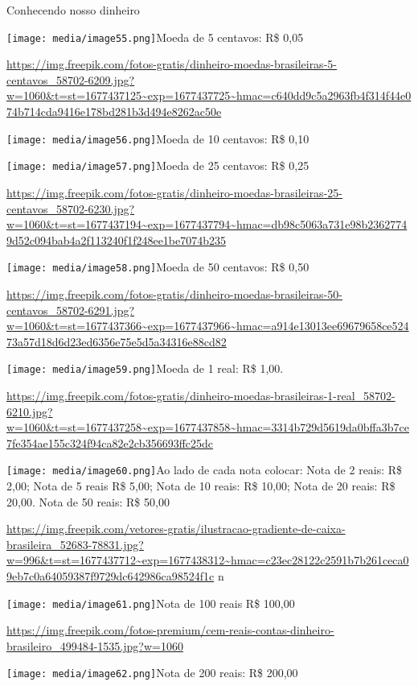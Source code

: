 Conhecendo nosso dinheiro

\texttt{[image: media/image55.png]}Moeda
de 5 centavos: R\$ 0,05

\url{https://img.freepik.com/fotos-gratis/dinheiro-moedas-brasileiras-5-centavos_58702-6209.jpg?w=1060\&t=st=1677437125~exp=1677437725~hmac=c640dd9c5a2963fb4f314f44e074b714cda9416e178bd281b3d494e8262ac50e}

\texttt{[image: media/image56.png]}Moeda
de 10 centavos: R\$ 0,10

\texttt{[image: media/image57.png]}Moeda
de 25 centavos: R\$ 0,25

\url{https://img.freepik.com/fotos-gratis/dinheiro-moedas-brasileiras-25-centavos_58702-6230.jpg?w=1060\&t=st=1677437194~exp=1677437794~hmac=db98c5063a731e98b23627749d52c094bab4a2f113240f1f248ee1be7074b235}

\texttt{[image: media/image58.png]}Moeda
de 50 centavos: R\$ 0,50

\url{https://img.freepik.com/fotos-gratis/dinheiro-moedas-brasileiras-50-centavos_58702-6291.jpg?w=1060\&t=st=1677437366~exp=1677437966~hmac=a914e13013ee69679658ce52473a57d18d6d23ed6356e75e5d5a34316e88cd82}

\texttt{[image: media/image59.png]}Moeda
de 1 real: R\$ 1,00.

\url{https://img.freepik.com/fotos-gratis/dinheiro-moedas-brasileiras-1-real_58702-6210.jpg?w=1060\&t=st=1677437258~exp=1677437858~hmac=3314b729d5619da0bffa3b7ce7fe354ae155c324f94ca82e2cb356693ffc25dc}

\texttt{[image: media/image60.png]}Ao
lado de cada nota colocar: Nota de 2 reais: R\$ 2,00; Nota de 5 reais
R\$ 5,00; Nota de 10 reais: R\$ 10,00; Nota de 20 reais: R\$ 20,00. Nota
de 50 reais: R\$ 50,00

\url{https://img.freepik.com/vetores-gratis/ilustracao-gradiente-de-caixa-brasileira_52683-78831.jpg?w=996\&t=st=1677437712~exp=1677438312~hmac=c23ec28122c2591b7b261ceca09eb7c0a64059387f9729dc642986ca98524f1c}
n

\texttt{[image: media/image61.png]}Nota
de 100 reais R\$ 100,00

\url{https://img.freepik.com/fotos-premium/cem-reais-contas-dinheiro-brasileiro_499484-1535.jpg?w=1060}

\texttt{[image: media/image62.png]}Nota
de 200 reais: R\$ 200,00

